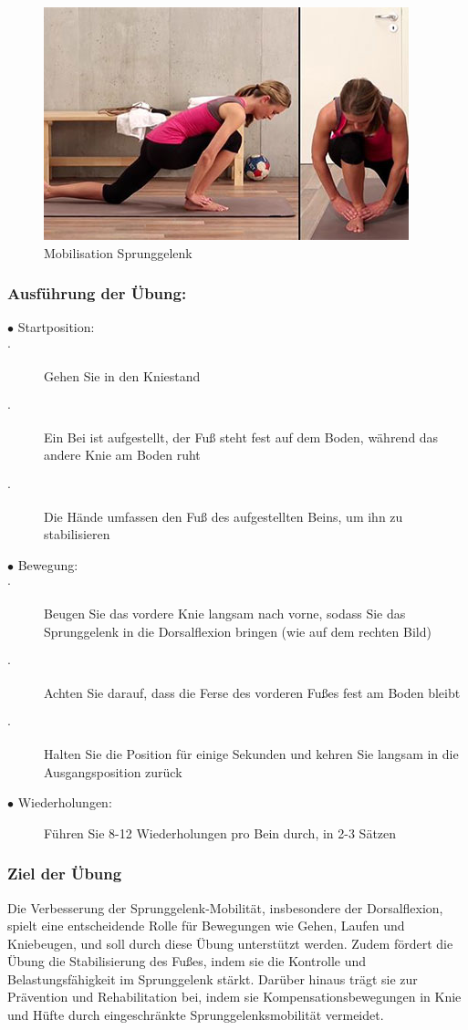 \begin{figure}
    \centering
    \includegraphics[width=0.5\linewidth]{img/Sprunggelenk-Mobilisation.JPG}
    \caption{Mobilisation Sprunggelenk \cite{valife}}
    \label{Mobilisation-Sprunggelenk}
\end{figure}


\subsubsection{Ausführung der Übung:}

\begin{description}
    \item[$\bullet$ Startposition:]
        \item[$\cdot$]Gehen Sie in den Kniestand
        \item[$\cdot$]Ein Bei ist aufgestellt, der Fuß steht fest auf dem Boden, während das andere Knie am Boden ruht
        \item[$\cdot$]Die Hände umfassen den Fuß des aufgestellten Beins, um ihn zu stabilisieren
    \item[$\bullet$ Bewegung: ]
        \item[$\cdot$]Beugen Sie das vordere Knie langsam nach vorne, sodass Sie das Sprunggelenk in die Dorsalflexion bringen (wie auf dem rechten Bild)
        \item[$\cdot$] Achten Sie darauf, dass die Ferse des vorderen Fußes fest am Boden bleibt
        \item[$\cdot$]Halten Sie die Position für einige Sekunden und kehren Sie langsam in die Ausgangsposition zurück
    \item[$\bullet$ Wiederholungen: ] Führen Sie 8-12 Wiederholungen pro Bein durch, in 2-3 Sätzen

\end{description}

\subsubsection{Ziel der Übung}
Die Verbesserung der Sprunggelenk-Mobilität, insbesondere der Dorsalflexion, spielt eine entscheidende Rolle für Bewegungen wie Gehen, Laufen und Kniebeugen, und soll durch diese Übung unterstützt werden.
Zudem fördert die Übung die Stabilisierung des Fußes, indem sie die Kontrolle und Belastungsfähigkeit im Sprunggelenk stärkt.
Darüber hinaus trägt sie zur Prävention und Rehabilitation bei, indem sie Kompensationsbewegungen in Knie und Hüfte durch eingeschränkte Sprunggelenksmobilität vermeidet.

